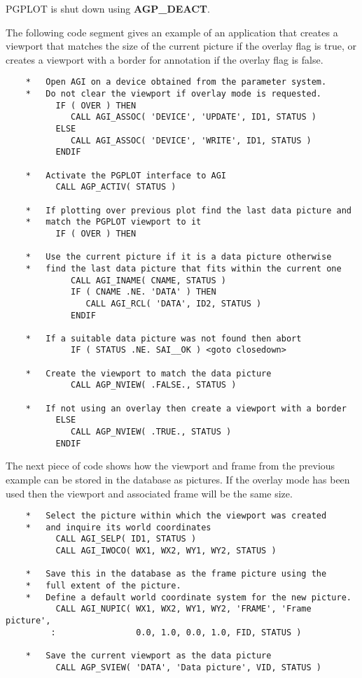 PGPLOT is shut down using {\bf AGP\_DEACT}.

The following code segment gives an example of an application that
creates a viewport that matches the size of the current picture if the
overlay flag is true, or creates a viewport with a border for annotation
if the overlay flag is false.
\begin{verbatim}
    *   Open AGI on a device obtained from the parameter system.
    *   Do not clear the viewport if overlay mode is requested.
          IF ( OVER ) THEN
             CALL AGI_ASSOC( 'DEVICE', 'UPDATE', ID1, STATUS )
          ELSE
             CALL AGI_ASSOC( 'DEVICE', 'WRITE', ID1, STATUS )
          ENDIF

    *   Activate the PGPLOT interface to AGI
          CALL AGP_ACTIV( STATUS )

    *   If plotting over previous plot find the last data picture and
    *   match the PGPLOT viewport to it
          IF ( OVER ) THEN

    *   Use the current picture if it is a data picture otherwise 
    *   find the last data picture that fits within the current one
             CALL AGI_INAME( CNAME, STATUS )
             IF ( CNAME .NE. 'DATA' ) THEN
                CALL AGI_RCL( 'DATA', ID2, STATUS )
             ENDIF

    *   If a suitable data picture was not found then abort
             IF ( STATUS .NE. SAI__OK ) <goto closedown>

    *   Create the viewport to match the data picture
             CALL AGP_NVIEW( .FALSE., STATUS )

    *   If not using an overlay then create a viewport with a border
          ELSE
             CALL AGP_NVIEW( .TRUE., STATUS )
          ENDIF
\end{verbatim}

The next piece of code shows how the viewport and frame from the previous
example can be stored in the database as pictures. If the overlay mode has
been used then the viewport and associated frame will be the same size.
\begin{verbatim}
    *   Select the picture within which the viewport was created
    *   and inquire its world coordinates
          CALL AGI_SELP( ID1, STATUS )
          CALL AGI_IWOCO( WX1, WX2, WY1, WY2, STATUS )

    *   Save this in the database as the frame picture using the
    *   full extent of the picture.
    *   Define a default world coordinate system for the new picture.
          CALL AGI_NUPIC( WX1, WX2, WY1, WY2, 'FRAME', 'Frame picture',
         :                0.0, 1.0, 0.0, 1.0, FID, STATUS )

    *   Save the current viewport as the data picture
          CALL AGP_SVIEW( 'DATA', 'Data picture', VID, STATUS )
\end{verbatim}

